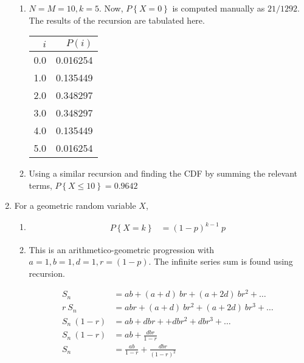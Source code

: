 \begin{enumerate}
\begin{enumerate}
			\item $ N = M = 10, k = 5 $. Now, $ P \left\{X = 0 \right\} $ is computed manually as $ 21/1292 $. The results of the recursion are tabulated here.
			\begin{table}[H]
				\centering				
				\begin{tabular}{@{}rr@{}}
					\toprule
					$ i $  &       $  P(i) $ \\
					\midrule
					0.0 & 0.016254 \\
					1.0 & 0.135449 \\
					2.0 & 0.348297 \\
					3.0 & 0.348297 \\
					4.0 & 0.135449 \\
					5.0 & 0.016254 \\
					\bottomrule
				\end{tabular}
			\end{table}
			
			\item Using a similar recursion and finding the CDF by summing the relevant terms, $ P\left\{X \leq 10\right\} = 0.9642$\\
			
		\end{enumerate}
	 
	
	\item For a geometric random variable $ X $,
	
		\begin{enumerate}
			\item \begin{align}
				P \left\{X = k\right\} &= (1-p)^{k-1}\ p 
			\end{align}
			
			\item This is an arithmetico-geometric progression with $ a = 1, b = 1, d = 1, r = (1-p) $. The infinite series sum is found using recursion.
			
			\begin{align}
				S_n &= ab + (a+d)\ br + (a+2d)\ br^2 + \dots \nonumber \\
				r\ S_n &= abr + (a+d)\ br^2 + (a+2d)\ br^3 + \dots \nonumber \\
				S_n\ (1-r) &= ab + dbr + +dbr^2 + dbr^3 + \dots \nonumber \\
				S_n\ (1-r) &= ab + \frac{dbr}{1-r} \nonumber \\
				S_n &= \frac{ab}{1-r} + \frac{dbr}{(1-r)^2}
			\end{align}
			

\end{enumerate}
\end{enumerate}
